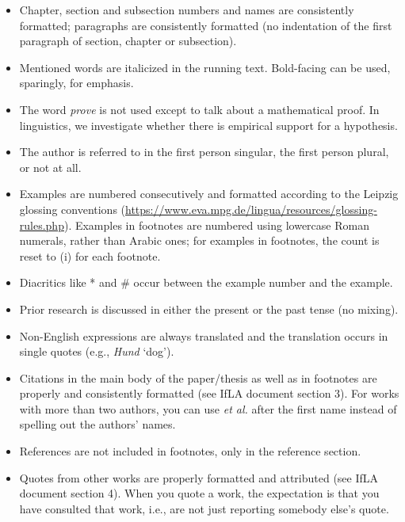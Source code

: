 \documentclass[11pt,fleqn,a4paper/thesis]{article}
\newcommand{\6}{\mbox{$[\hspace*{-.6mm}[$}}
\newcommand{\9}{\mbox{$]\hspace*{-.6mm}]$}}
\begin{document}
\begin{itemize}[itemsep=-1pt,leftmargin=2.5ex,topsep=-2pt]
\item Chapter, section and subsection numbers and names are consistently formatted; paragraphs are consistently formatted (no indentation of the first paragraph of section, chapter or subsection).

\item Mentioned words are italicized in the running text. Bold-facing can be used, sparingly, for emphasis.

\item The word {\em prove} is not used except to talk about a mathematical proof. In linguistics, we investigate whether there is empirical support for a hypothesis. 

\item The author is referred to in the first person singular, the first person plural, or not at all.

\item Examples are numbered consecutively and formatted according to the Leipzig glossing conventions (\url{https://www.eva.mpg.de/lingua/resources/glossing-rules.php}). Examples in footnotes are numbered using lowercase Roman numerals, rather than Arabic ones; for examples in footnotes, the count is reset to (i) for each footnote.

\item Diacritics like * and \# occur between the example number and the example.

\item Prior research is discussed in either the present or the past tense (no mixing).

\item Non-English expressions are always translated and the translation occurs in single quotes (e.g., {\em Hund} `dog').

\item Citations in the main body of the paper/thesis as well as in footnotes are properly and consistently formatted (see IfLA document section 3). For works with more than two authors, you can use {\em et al.} after the first name instead of spelling out the authors' names. 

\item References are not included in footnotes, only in the reference section.

\item Quotes from other works are properly formatted and attributed (see IfLA document section 4). When you quote a work, the expectation is that you have consulted that work, i.e., are not just reporting somebody else's quote.


\end{itemize}
\end{document}
